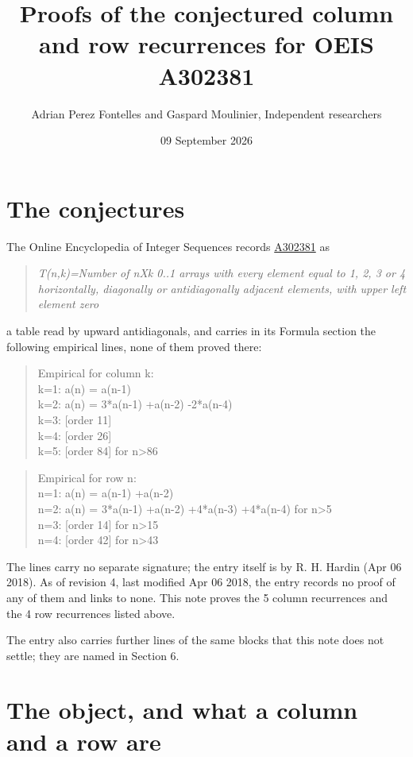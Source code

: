 \documentclass[11pt]{article}
\title{Proofs of the conjectured column and row recurrences for OEIS A302381}
\author{Adrian Perez Fontelles and Gaspard Moulinier, Independent researchers}
\date{09 September 2026}
\theoremstyle{definition}
\begin{document}
\maketitle
\section{The conjectures}

The Online Encyclopedia of Integer Sequences records \href{https://oeis.org/A302381}{A302381} as

\begin{quote}\itshape T(n,k)=Number of nXk 0..1 arrays with every element equal to 1, 2, 3 or 4 horizontally, diagonally or antidiagonally adjacent elements, with upper left element zero\end{quote}

a table read by upward antidiagonals, and carries in its Formula section the following empirical lines, none of them proved there:

\begin{quote}\ttfamily Empirical for column k:\\
k=1: a(n) = a(n-1)\\k=2: a(n) = 3*a(n-1) +a(n-2) -2*a(n-4)\\k=3: [order 11]\\k=4: [order 26]\\k=5: [order 84] for n>86\end{quote}

\begin{quote}\ttfamily Empirical for row n:\\
n=1: a(n) = a(n-1) +a(n-2)\\n=2: a(n) = 3*a(n-1) +a(n-2) +4*a(n-3) +4*a(n-4) for n>5\\n=3: [order 14] for n>15\\n=4: [order 42] for n>43\end{quote}

The lines carry no separate signature; the entry itself is by R. H. Hardin (Apr 06 2018). As of revision 4, last modified Apr 06 2018, the entry records no proof of any of them and links to none. This note proves the 5 column recurrences and the 4 row recurrences listed above.

The entry also carries further lines of the same blocks that this note does not settle; they are named in Section 6.

\section{The object, and what a column and a row are}
\end{document}
